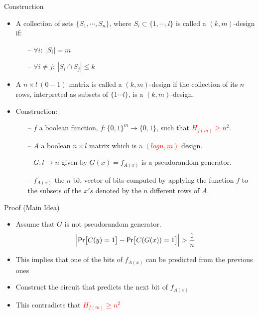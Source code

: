 \documentclass[xcolor={table,dvipsnames,usenames}]{beamer}
\begin{document}
\begin{frame}{Construction}
\begin{itemize}
	\pause
	\item A collection of sets $\{S_1, \cdots, S_n\}$, where $S_i \subset \{1, \cdots ,l\}$ is called a $(k,m)$-design if:
	\begin{itemize}
		\item[--] $\forall i:~|S_i| = m$
		\item[--] $\forall i \neq j:~|S_i \cap S_j| \leq k$
	\end{itemize}
	\pause
	\item A $n \times l~(0-1)$ matrix is called a $(k,m)$-design if the collection of its $n$ rows, interpreted as subsets of $\{1 \cdots l\}$, is a $(k,m)$-design.
	\pause
	\item Construction:
	\pause
	\begin{itemize}
		\item[--] $f$ a boolean function, $f:\{0, 1\}^m \rightarrow \{0, 1\}$, such that \textcolor{red}{$H_{f(m)} \ge n^2$}.
		\pause
		\item[--] $A$ a boolean $n \times l$ matrix which is a \textcolor{red}{$(logn,m)$} design.
		\pause
		\item[--] $G:l \rightarrow n$ given by $G(x) = f_{A(x)}$ is a pseudorandom generator.
		\pause
		\item[--] $f_{A(x)}$ the $n$ bit vector of bits computed by applying the function $f$ to the subsets of the $x's$ denoted by the $n$ different rows of $A$.
	\end{itemize}
\end{itemize}
\end{frame}
\begin{frame}{Proof (Main Idea)}
\begin{itemize}
	\item Assume that $G$ is not pseudorandom generator.
	$$ \Big|\mathsf{Pr}\big[C(y)=1\big] - \mathsf{Pr}\big[C(G (x))=1\big]\Big| > \frac{1}{n}$$
	\pause
	\item This implies that one of the bits of $f_{A(x)}$ can be predicted from the previous ones
	\pause 
	\item Construct the circuit that predicts the next bit of $f_{A(x)}$
	\pause
	\item This contradicts that  \textcolor{red}{$H_{f(m)} \ge n^2$}
\end{itemize}
\end{frame}
\end{document}

